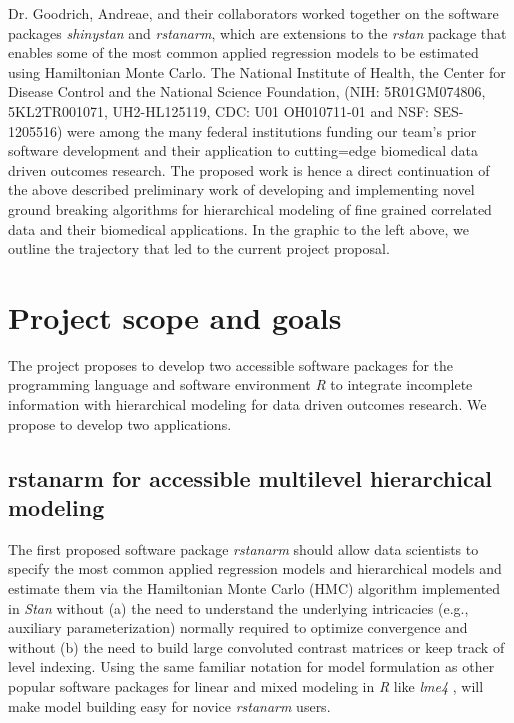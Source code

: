 \documentclass[11pt,notitlepage]{article}
\begin{document}
Dr. Goodrich, Andreae, and their collaborators worked together on the software packages 
\textit{shinystan} and \textit{rstanarm}, which are extensions to the \textit{rstan} package 
that enables some of the most common applied regression models to be estimated using Hamiltonian Monte Carlo. 
The National Institute of Health, the Center for Disease Control and the National Science Foundation, 
(NIH: 5R01GM074806, 5KL2TR001071, UH2-HL125119,  CDC: U01 OH010711-01 and NSF: SES-1205516) were among the many 
federal institutions funding our team's prior software \cite{Stan-manual:2015} development and their application 
to cutting=edge biomedical data driven outcomes research. The proposed work is hence a direct continuation of the 
above described preliminary work of developing and implementing novel ground breaking algorithms for hierarchical 
modeling of fine grained correlated data and their biomedical applications. In the graphic to the left above, we 
outline the trajectory that led to the current project proposal.


\section*{Project scope and goals }

The project proposes to develop two accessible software packages for the programming language and software environment \textit{R} 
to integrate incomplete information with hierarchical modeling for data driven outcomes research. We propose to develop two applications.

\subsection*{rstanarm for accessible multilevel hierarchical modeling}
The first proposed software package \textit{rstanarm} should allow data scientists to specify the most common applied regression models 
and hierarchical models and estimate them via the Hamiltonian Monte Carlo (HMC) algorithm implemented in \textit{Stan} without (a) 
the need to understand the underlying intricacies (e.g., auxiliary parameterization) normally required to optimize convergence and 
without (b) the need to build large convoluted contrast matrices  or keep track of level indexing. Using the same familiar notation for 
model formulation as other popular software packages for linear and mixed modeling in \textit{R} like \textit{lme4} \cite{lme4}, will 
make model building easy for novice \textit{rstanarm} users. 
\end{document}
